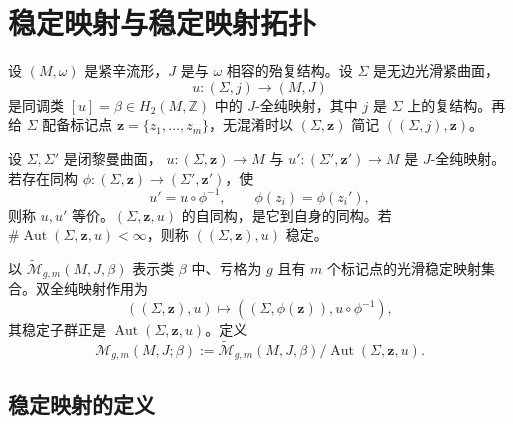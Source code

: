 \clearpage
\vspace*{1.5\baselineskip}
\section{稳定映射与稳定映射拓扑}
\label{sec:stable-map-stable-map-topology}

设 $(M,\omega)$ 是紧辛流形，$J$ 是与 $\omega$ 相容的殆复结构。设
$\Sigma$ 是无边光滑紧曲面，
\[
 u:(\Sigma,j)\longrightarrow(M,J)
\]
是同调类 $[u]=\beta\in H_2(M,\mathbb Z)$ 中的 $J$-全纯映射，其中 $j$ 是
$\Sigma$ 上的复结构。再给 $\Sigma$ 配备标记点
$\boldsymbol z=\{z_1,\ldots,z_m\}$，无混淆时以 $(\Sigma,\boldsymbol z)$ 简记
$((\Sigma,j),\boldsymbol z)$。

\begin{definition}\label{def:equivalence-smooth-marked-holomorphic-maps}
设 $\Sigma,\Sigma'$ 是闭黎曼曲面，
$u:(\Sigma,\boldsymbol z)\to M$ 与
$u':(\Sigma',\boldsymbol z')\to M$ 是 $J$-全纯映射。若存在同构
$\phi:(\Sigma,\boldsymbol z)\to(\Sigma',\boldsymbol z')$，使
\[
 u'=u\circ\phi^{-1},
 \qquad \phi(z_i)=\phi(z_i'),
\]
则称 $u,u'$ 等价。$(\Sigma,\boldsymbol z,u)$ 的自同构，是它到自身的同构。若
$\#\operatorname{Aut}(\Sigma,\boldsymbol z,u)<\infty$，则称
$((\Sigma,\boldsymbol z),u)$ 稳定。
\end{definition}

以 $\widetilde{\mathcal M}_{g,m}(M,J,\beta)$ 表示类 $\beta$ 中、亏格为 $g$ 且有 $m$ 个标记点的光滑稳定映射集合。双全纯映射作用为
\[
 ((\Sigma,\boldsymbol z),u)
 \longmapsto((\Sigma,\phi(\boldsymbol z)),u\circ\phi^{-1}),
\]
其稳定子群正是 $\operatorname{Aut}(\Sigma,\boldsymbol z,u)$。定义
\[
 \mathcal M_{g,m}(M,J;\beta)
 :=\widetilde{\mathcal M}_{g,m}(M,J,\beta)/
 \operatorname{Aut}(\Sigma,\boldsymbol z,u).
\]

\subsection{稳定映射的定义}
\label{subsec:definition-stable-maps}

